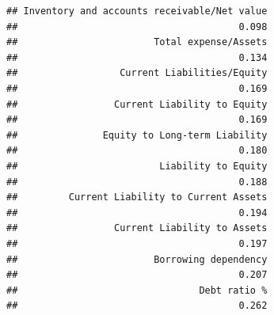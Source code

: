 \documentclass[
]{book}
\begin{document}
\begin{verbatim}
## Inventory and accounts receivable/Net value 
##                                       0.098 
##                        Total expense/Assets 
##                                       0.134 
##                  Current Liabilities/Equity 
##                                       0.169 
##                 Current Liability to Equity 
##                                       0.169 
##               Equity to Long-term Liability 
##                                       0.180 
##                         Liability to Equity 
##                                       0.188 
##         Current Liability to Current Assets 
##                                       0.194 
##                 Current Liability to Assets 
##                                       0.197 
##                        Borrowing dependency 
##                                       0.207 
##                                Debt ratio % 
##                                       0.262
\end{verbatim}
\end{document}
